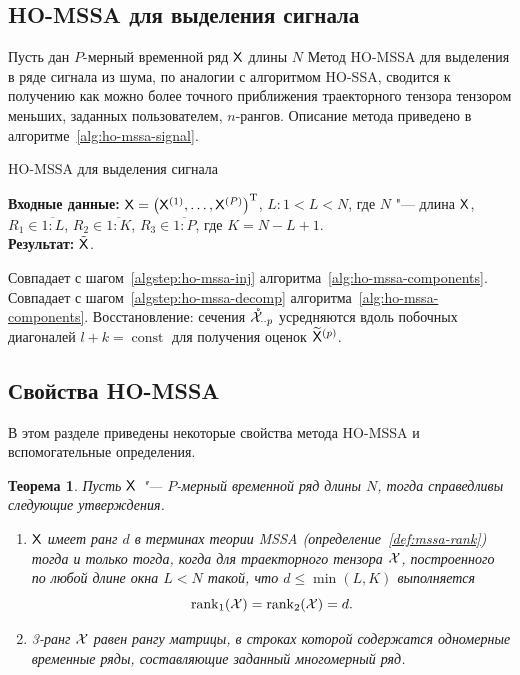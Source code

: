 \documentclass[specialist,
  substylefile=spbu_report.rtx,
subf,href,colorlinks=true, 12pt]{disser}
\theoremstyle{plain}
\newtheorem{theorem}{Теорема}
\theoremstyle{definition}
\theoremstyle{remark}
\newcommand{\Input}{\textbf{Входные данные: }}
\newcommand{\Output}{\textbf{Результат: }}
\begin{document}
\subsection{HO-MSSA для выделения сигнала}
\label{subsec:ho-mssa-desc-signal}
Пусть дан $P$-мерный временной ряд $\mathsf{X}$ длины $N$
Метод HO-MSSA для выделения в ряде сигнала из шума, по аналогии с
алгоритмом HO-SSA, сводится к получению как можно более точного
приближения траекторного тензора тензором меньших,
заданных пользователем, $n$-рангов.
Описание метода приведено в алгоритме~\ref{alg:ho-mssa-signal}.

\begin{algorithm}[!ht]
  \caption{HO-MSSA для выделения сигнала}
  \label{alg:ho-mssa-signal}
  \Input $\mathsf{X} = \left(\mathsf{X}^{(1)}, \ldots, \mathsf{X}^{(P)}\right)^{\mathrm{T}}$,
  $L: 1< L < N$, где $N$ "--- длина $\mathsf{X}$, $R_1 \in \overline{1:L}$,
  $R_2 \in \overline{1:K}$, $R_3 \in \overline{1:P}$, где $K = N-L+1$.\\
  \Output $\tilde{\mathsf{X}}$.
  \begin{algorithmic}[1]
    \State Совпадает с шагом~\ref{algstep:ho-mssa-inj}
    алгоритма~\ref{alg:ho-mssa-components}.
    \State Совпадает с шагом~\ref{algstep:ho-mssa-decomp}
    алгоритма~\ref{alg:ho-mssa-components}.
    \State Восстановление:
    сечения $\mathring{\mathcal{X}}_{\cdot\cdot p}$ усредняются вдоль
    побочных диагоналей $l + k = \operatorname{const}$ для
    получения оценок $\widetilde{\mathsf{X}}^{(p)}$.
  \end{algorithmic}
\end{algorithm}

\subsection{Свойства HO-MSSA}
В этом разделе приведены некоторые свойства метода HO-MSSA и
вспомогательные определения.

\begin{theorem}
  \label{state:hosvd-mssa-rang}
  Пусть $\mathsf{X}$ "--- $P$-мерный временной ряд длины $N$, тогда
  справедливы следующие утверждения.
  \begin{enumerate}
    \item $\mathsf{X}$ имеет ранг $d$ в терминах теории \emph{MSSA}
      (определение~\ref{def:mssa-rank})
      тогда и только тогда, когда для траекторного тензора $\mathcal{X}$,
      построенного по любой длине окна
      $L<N$ такой, что $d \leqslant\min(L, K)$ выполняется
      \[\operatorname{rank}_1(\mathcal{X}) = \operatorname{rank}_2(\mathcal{X}) = d.\]
    \item 3-ранг $\mathcal{X}$ равен рангу матрицы,
      в строках которой содержатся одномерные временные ряды,
      составляющие заданный
      многомерный ряд.
  \end{enumerate}
\end{theorem}
\end{document}
